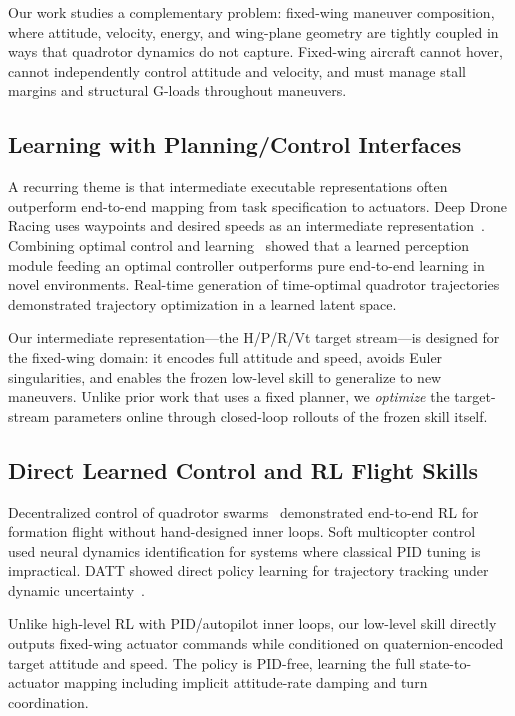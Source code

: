 \documentclass{article}
\begin{document}
Our work studies a complementary problem: fixed-wing maneuver composition, where attitude, velocity, energy, and wing-plane geometry are tightly coupled in ways that quadrotor dynamics do not capture.
Fixed-wing aircraft cannot hover, cannot independently control attitude and velocity, and must manage stall margins and structural G-loads throughout maneuvers.

\subsection{Learning with Planning/Control Interfaces}

A recurring theme is that intermediate executable representations often outperform end-to-end mapping from task specification to actuators.
Deep Drone Racing uses waypoints and desired speeds as an intermediate representation~\citep{kaufmann2023deep}.
Combining optimal control and learning~\citep{kaufmann2019combining} showed that a learned perception module feeding an optimal controller outperforms pure end-to-end learning in novel environments.
Real-time generation of time-optimal quadrotor trajectories~\citep{penicka2022real} demonstrated trajectory optimization in a learned latent space.

Our intermediate representation---the H/P/R/Vt target stream---is designed for the fixed-wing domain: it encodes full attitude and speed, avoids Euler singularities, and enables the frozen low-level skill to generalize to new maneuvers.
Unlike prior work that uses a fixed planner, we \emph{optimize} the target-stream parameters online through closed-loop rollouts of the frozen skill itself.

\subsection{Direct Learned Control and RL Flight Skills}

Decentralized control of quadrotor swarms~\citep{batra2022decentralized} demonstrated end-to-end RL for formation flight without hand-designed inner loops.
Soft multicopter control~\citep{song2021soft} used neural dynamics identification for systems where classical PID tuning is impractical.
DATT showed direct policy learning for trajectory tracking under dynamic uncertainty~\citep{huang2023datt}.

Unlike high-level RL with PID/autopilot inner loops, our low-level skill directly outputs fixed-wing actuator commands while conditioned on quaternion-encoded target attitude and speed.
The policy is PID-free, learning the full state-to-actuator mapping including implicit attitude-rate damping and turn coordination.
\end{document}
